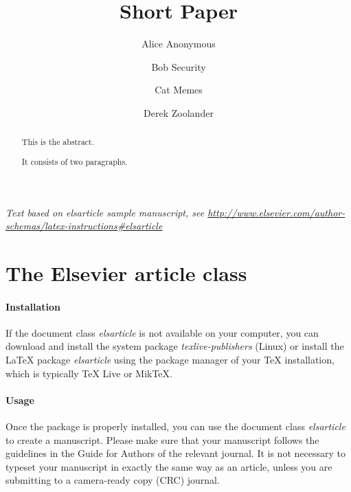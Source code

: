 \documentclass[]{elsarticle} %
\begin{document}
\begin{frontmatter}

  \title{Short Paper}
    \author[Some Institute of Technology]{Alice Anonymous}
    \author[Another University]{Bob Security}
    \author[Another University]{Cat Memes}
    \author[Some Institute of Technology]{Derek Zoolander}
      \address[Some Institute of Technology]{Department, Street, City, State, Zip}
    \address[Another University]{Department, Street, City, State, Zip}
  
  \begin{abstract}
  This is the abstract.
  
  It consists of two paragraphs.
  \end{abstract}
  
 \end{frontmatter}

\emph{Text based on elsarticle sample manuscript, see
\url{http://www.elsevier.com/author-schemas/latex-instructions\#elsarticle}}

\hypertarget{the-elsevier-article-class}{%
\section{The Elsevier article class}\label{the-elsevier-article-class}}

\hypertarget{installation}{%
\paragraph{Installation}\label{installation}}

If the document class \emph{elsarticle} is not available on your
computer, you can download and install the system package
\emph{texlive-publishers} (Linux) or install the LaTeX package
\emph{elsarticle} using the package manager of your TeX installation,
which is typically TeX Live or MikTeX.

\hypertarget{usage}{%
\paragraph{Usage}\label{usage}}

Once the package is properly installed, you can use the document class
\emph{elsarticle} to create a manuscript. Please make sure that your
manuscript follows the guidelines in the Guide for Authors of the
relevant journal. It is not necessary to typeset your manuscript in
exactly the same way as an article, unless you are submitting to a
camera-ready copy (CRC) journal.
\end{document}
